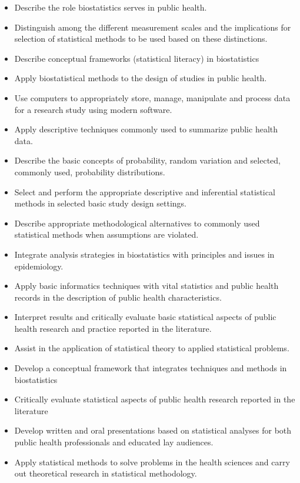 \documentclass[10pt]{article}
\begin{document}
  
  \clearpage
\bigskip
{}
\begin{itemize}
\item Describe the role biostatistics serves in public health.
\item Distinguish among the different measurement scales and the implications for selection of statistical methods to be used based on these distinctions.
\item Describe conceptual frameworks (statistical literacy) in biostatistics
\item Apply biostatistical methods to the design of studies in public health.
\item Use computers to appropriately store, manage, manipulate and process data for a research study using modern software.
\item Apply descriptive techniques commonly used to summarize public health data. 
\item Describe the basic concepts of probability, random variation and selected, commonly used, probability distributions.
\item Select and perform the appropriate descriptive and inferential statistical methods in selected basic study design settings.
\item Describe appropriate methodological alternatives to commonly used statistical methods when assumptions are violated.
\item Integrate analysis strategies in biostatistics with principles and issues in epidemiology.
\item Apply basic informatics techniques with vital statistics and public health records in the description of public health characteristics.
\item Interpret results and critically evaluate basic statistical aspects of public health research and practice reported in the literature.
\item Assist in the application of statistical theory to applied statistical problems.
\item Develop a conceptual framework that integrates techniques and methods in biostatistics 
\item Critically evaluate statistical aspects of public health research reported in the literature
\item Develop written and oral presentations based on statistical analyses for both public health professionals and educated lay audiences.
\item Apply statistical methods to solve problems in the health sciences and carry out theoretical research in statistical methodology.
\end{itemize}
  
\end{document}
